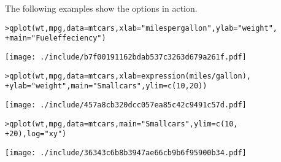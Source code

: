 The following examples show the options in action.

\begin{alltt}
> qplot(wt, mpg, data = mtcars, xlab = "miles per gallon", ylab = "weight", 
+     main = "Fuel effeciency")
\end{alltt}
\texttt{[image: ./include/b7f00191162bdab537c3263d679a261f.pdf]}
\begin{alltt}

> qplot(wt, mpg, data = mtcars, xlab = expression(miles/gallon), 
+     ylab = "weight", main = "Small cars", ylim = c(10, 20))
\end{alltt}
\texttt{[image: ./include/457a8cb320dcc057ea85c42c9491c57d.pdf]}
\begin{alltt}

> qplot(wt, mpg, data = mtcars, main = "Small cars", ylim = c(10, 
+     20), log = "xy")
\end{alltt}
\texttt{[image: ./include/36343c6b8b3947ae66cb9b6f95900b34.pdf]}
\begin{alltt}

\end{alltt}



